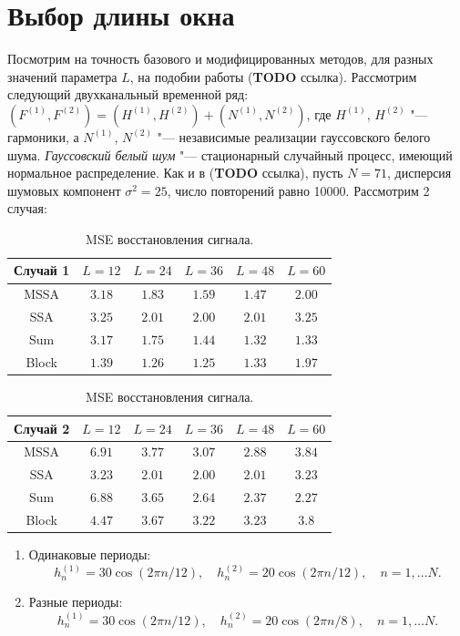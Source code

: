 \documentclass[specialist,
substylefile = spbu_report.rtx,
subf,href,colorlinks=true, 12pt]{disser}
\theoremstyle{definition}
\begin{document}
	\section{Выбор длины окна}
	Посмотрим на точность базового и модифицированных методов, для разных значений параметра $L$, на подобии работы (\textbf{TODO} ссылка). Рассмотрим следующий двухканальный временной ряд: $(F^{(1)}, F^{(2)})=(H^{(1)},H^{(2)}) + (N^{(1)},N^{(2)})$, где $H^{(1)}$, $H^{(2)}$ "--- гармоники, а $N^{(1)}$, $N^{(2)}$ "--- независимые реализации гауссовского белого шума. \textit{Гауссовский белый шум} "--- стационарный случайный процесс, имеющий нормальное распределение. Как и в (\textbf{TODO} ссылка), пусть $N=71$, дисперсия шумовых компонент $\sigma^2=25$, число повторений равно 10000. Рассмотрим 2 случая:
		\begin{table}[h]
		\centering
		\begin{tabular}{cccccc}\hline
			Случай 1 & $L=12$ & $L=24$ & $L=36$ & $L=48$ & $L=60$\\
			\hline
			MSSA & $3.18$ & $1.83$ & $1.59$ & $\mathbf{1.47}$ & $2.00$\\
			\hline
			SSA & $3.25$ & $\mathbf{2.01}$ & $\mathbf{2.00}$ & $\mathbf{2.01}$ & $3.25$\\
			\hline
			Sum &  $3.17$ & $1.75$ & $1.44$ & $\mathbf{1.32}$ & $\mathbf{1.33}$\\
			\hline
			Block & $1.39$ & $\mathbf{1.26}$ & $\mathbf{1.25}$ & $1.33$ & $1.97$\\
			\hline
		\end{tabular}
		\begin{tabular}{cccccc}\hline
			Случай 2 & $L=12$ & $L=24$ & $L=36$ & $L=48$ & $L=60$\\
			\hline
			MSSA & $6.91$ & $3.77$ & $3.07$ & $\mathbf{2.88}$ & $3.84$\\
			\hline
			SSA & $3.23$ & $\mathbf{2.01}$ & $\mathbf{2.00}$ & $\mathbf{2.01}$ & $3.23$\\
			\hline
			Sum & $6.88$ & $3.65$ & $2.64$ & $2.37$ & $\mathbf{2.27}$\\
			\hline
			Block & $4.47$ & $3.67$ & $\mathbf{3.22}$ & $\mathbf{3.23}$ & $3.8$\\
			\hline
		\end{tabular}
		\caption{MSE восстановления сигнала.}
		\label{tab:mse}
	\end{table}
	\begin{enumerate}
		\item Одинаковые периоды:
		\[
		h_n^{(1)}=30\cos(2\pi n/12),\quad h_n^{(2)}=20\cos(2\pi n/12),\quad n=1,\ldots N.
		\]
		\item Разные периоды:
		\[
		h_n^{(1)}=30\cos(2\pi n/12),\quad h_n^{(2)}=20\cos(2\pi n/8),\quad n=1,\ldots N.
		\]
	\end{enumerate}
\end{document}
